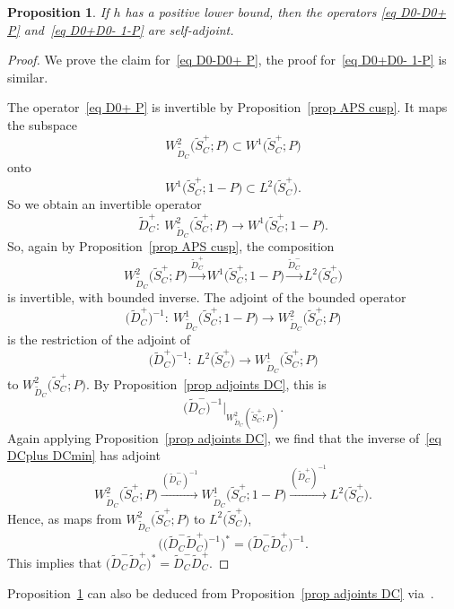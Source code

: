 \documentclass[10pt,a4paper]{amsart}
\numberwithin{equation}{section}
\newtheorem{Proposition}[Theorem]{Proposition}
 { \theoremstyle{definition}
\newtheorem{Definition}[Theorem]{Definition}
\newtheorem{Note}[Theorem]{Note}
\newtheorem{Example}[Theorem]{Example}
\newtheorem{Remark}[Theorem]{Remark} }
\begin{document}
\begin{Proposition}\label{prop DC2 sa}
If $h$ has a positive lower bound, then the operators
\eqref{eq D0-D0+ P} and~\eqref{eq D0+D0- 1-P}
are self-adjoint.
\end{Proposition}
\begin{proof}
We prove the claim for~\eqref{eq D0-D0+ P}, the proof for~\eqref{eq D0+D0- 1-P} is similar.

The operator~\eqref{eq D0+ P} is invertible by Proposition~\ref{prop APS cusp}. It maps the subspace
\[
W^2_{\widetilde{D}_C}\big(\widetilde{S}_C^+; P\big) \subset W^1\big(\widetilde{S}_C^+; P\big)
\]
onto
\[
W^1\big(\widetilde{S}_C^+; 1-P\big) \subset L^2\big(\widetilde{S}_C^+\big).
\]
 So we obtain an invertible operator
\begin{equation*} %
\widetilde{D}_C^+\colon\ W^2_{\widetilde{D}_C}\big(\widetilde{S}_C^+; P\big) \to W^1\big(\widetilde{S}_C^+; 1-P\big).
\end{equation*}
So, again by Proposition~\ref{prop APS cusp}, the composition
\begin{equation} \label{eq DCplus DCmin}
W^2_{\widetilde{D}_C}\big(\widetilde{S}_C^+; P\big) \xrightarrow{\widetilde{D}_C^+} W^1\big(\widetilde{S}_C^+; 1-P\big)\xrightarrow{\widetilde{D}_C^-} L^2\big(\widetilde{S}_C^+\big)
\end{equation}
is invertible, with bounded inverse. The adjoint of the bounded operator
\[
\big(\widetilde{D}_C^+\big)^{-1}\colon\
W^1_{\widetilde{D}_C}\big(\widetilde{S}_C^+; 1-P\big)\to W^2_{\widetilde{D}_C}\big(\widetilde{S}_C^+; P\big)
\]
is the restriction of the adjoint of
\[
\big(\widetilde{D}_C^+\big)^{-1}\colon\ L^2\big(\widetilde{S}_C^+\big)\to W^1_{\widetilde{D}_C}\big(\widetilde{S}_C^+; P\big)
\]
to $W^2_{\widetilde{D}_C}\big(\widetilde{S}_C^+; P\big)$.
By Proposition~\ref{prop adjoints DC}, this is
\[
 \big(\widetilde{D}_C^-\big)^{-1}|_{W^2_{\widetilde{D}_C}(\widetilde{S}_C^+; P) }.
\]
Again applying Proposition~\ref{prop adjoints DC}, we find that the inverse of~\eqref{eq DCplus DCmin} has adjoint
\[
W^2_{\widetilde{D}_C}\big(\widetilde{S}_C^+; P\big) \xrightarrow{ (\widetilde{D}_C^-)^{-1}} W^1_{\widetilde{D}_C}\big(\widetilde{S}_C^+; 1-P\big)\xrightarrow{(\widetilde{D}_C^+)^{-1}} L^2\big(\widetilde{S}_C^+\big).
\]
Hence, as maps from $W^2_{\widetilde{D}_C}\big(\widetilde{S}_C^+; P\big)$ to $L^2\big(\widetilde{S}_C^+\big)$,
\[
\big(\big(\widetilde{D}_C^- \widetilde{D}_C^+\big)^{-1}\big)^* = \big(\widetilde{D}_C^- \widetilde{D}_C^+\big)^{-1}.
\]
This implies that $\big(\widetilde{D}_C^- \widetilde{D}_C^+\big)^* = \widetilde{D}_C^- \widetilde{D}_C^+$.
\end{proof}
\begin{Remark}
Proposition~\ref{prop DC2 sa} can also be deduced from Proposition~\ref{prop adjoints DC} via~\cite[Theorem~X.25]{RSII}.
\end{Remark}
\end{document}
